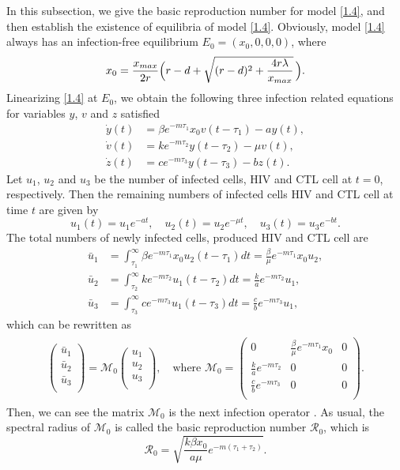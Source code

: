 \documentclass[10pt,a4paper]{amsart}
\numberwithin{equation}{section}
\begin{document}
In this subsection, we  give the basic reproduction number for model \eqref{1.4}, 
and then establish the existence of equilibria of model \eqref{1.4}.  
Obviously,   model \eqref{1.4} always has an infection-free equilibrium
 $E_0=(x_0,0,0,0)$, where
\begin{equation} \label{2.4}
 x_0=\frac{x_{\rm max}}{2r} \Big(r-d+\sqrt{(r-d)^{2}
 +\frac{4r\lambda}{x_{\rm max}}}\, \Big).
\end{equation}
Linearizing \eqref{1.4} at $E_0$, we obtain the following three infection related
equations for variables $y$, $v$ and $z$ satisfied
 \begin{align*}
\dot{y}(t)&= \beta e^{-m\tau_1}x_0v(t-\tau_1)-ay(t),\\
\dot{v}(t)&= k e^{-m\tau_2}y(t-\tau_2)-\mu v(t),\\
\dot{z}(t)&= ce^{-m\tau_3}y(t-\tau_3)-bz(t).
\end{align*}
Let $u_1$, $u_2$ and $u_3$ be the number of infected cells, HIV and CTL cell at $t=0$,
respectively. Then the remaining numbers of infected cells
 HIV and CTL  cell at time $t$ are given by
$$
u_1(t)=u_1e^{-at},\quad u_2(t)=u_2e^{-\mu t}, \quad u_3(t)=u_3e^{-bt}.
$$
The total numbers of newly infected cells, produced HIV and CTL  cell are
\begin{align*}
\bar{u}_1&=  \int_{\tau_{1}}^{\infty}\beta e^{-m\tau_1}x_0u_2(t-\tau_1)dt=\frac{\beta }{\mu}e^{-m\tau_1}x_0u_2,\\
\bar{u}_2&=  \int_{\tau_{2}}^{\infty}k e^{-m\tau_2} u_1(t-\tau_2)dt=\frac{k}{a}e^{-m\tau_2}u_1,\\
\bar{u}_3&= \int_{\tau_{3}}^{\infty}ce^{-m\tau_3} u_1(t-\tau_3)dt=\frac{c}{b}e^{-m\tau_3}u_1,
\end{align*}
which can be rewritten as
\begin{align*}
\begin{array}{ll}
\begin{pmatrix} \bar{u}_1\\
\bar{u}_2\\
\bar{u}_3\\
\end{pmatrix}=\mathcal{M}_0
\begin{pmatrix}
 {u}_1\\
 {u}_2\\
 {u}_3\\
 \end{pmatrix},
 \quad \text{where } 
 \mathcal{M}_0=\begin{pmatrix}
 0&\frac{\beta }{\mu} e^{-m \tau_1}x_0&0\\
 \frac{k}{a} e^{-m\tau_2}&0&0\\
 \frac{c}{b}e^{-m\tau_3}&0&0\\
 \end{pmatrix}.
 \end{array}
 \end{align*}
Then, we can see the matrix $\mathcal{M}_0$ is the next infection operator \cite{DW}.
 As usual, the spectral radius of $\mathcal{M}_0$ is called the basic reproduction
number $\mathcal{R}_0$,  which is
\[
 \mathcal{R}_0=\sqrt{{\frac{k\beta x_0}{a\mu}e^{-m(\tau_1+\tau_2)}}}.
\]
\end{document}
